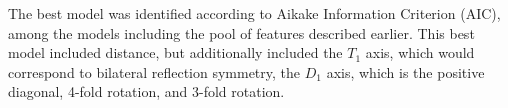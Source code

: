 The best model was identified according to Aikake Information Criterion (AIC), among the models including the pool of features described earlier. This best model included distance, but additionally included the $T_1$ axis, which would correspond to bilateral reflection symmetry, the $D_1$ axis, which is the positive diagonal, 4-fold rotation, and 3-fold rotation.